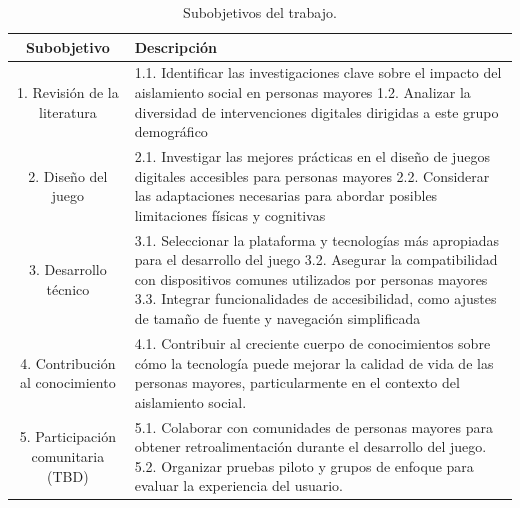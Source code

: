 \newpage
\begin{table}[t]
  \centering
  \begin{tabular}{| c | p{9.6cm} |}
    \hline
    \textbf{Subobjetivo} & \textbf{Descripción} \\
    \hline
    1. Revisión de la literatura & 
        1.1. Identificar las investigaciones clave sobre el impacto del aislamiento social en personas mayores \newline
        \vspace{0.2cm}
        1.2. Analizar la diversidad de intervenciones digitales dirigidas a este grupo demográfico \vspace{0.2cm} \\
    \hline
    2. Diseño del juego &
        2.1. Investigar las mejores prácticas en el diseño de juegos digitales accesibles para personas mayores \newline
        \vspace{0.2cm}
        2.2. Considerar las adaptaciones necesarias para abordar posibles limitaciones físicas y cognitivas
        \vspace{0.2cm} \\
    \hline
    3. Desarrollo técnico & 
        3.1. Seleccionar la plataforma y tecnologías más apropiadas para el desarrollo del juego \newline
        \vspace{0.2cm}
        3.2. Asegurar la compatibilidad con dispositivos comunes utilizados por personas mayores \newline
        \vspace{0.2cm}
        3.3. Integrar funcionalidades de accesibilidad, como ajustes de tamaño de fuente y navegación simplificada \vspace{0.2cm} \\
    \hline
    4. Contribución al conocimiento & 
    4.1. Contribuir al creciente cuerpo de conocimientos sobre cómo la tecnología puede mejorar la calidad de vida de las personas mayores, particularmente en el contexto del aislamiento social. 
    \vspace{0.2cm} \\
    \hline
    5. Participación comunitaria (TBD) & 
        5.1. Colaborar con comunidades de personas mayores para obtener retroalimentación durante el desarrollo del juego. \newline
        \vspace{0.2cm}
        5.2. Organizar pruebas piloto y grupos de enfoque para evaluar la experiencia del usuario. \vspace{0.2cm} \\
    \hline
    \end{tabular}
  \caption{Subobjetivos del trabajo.}
  \label{tab:subobjetivos}
\end{table}